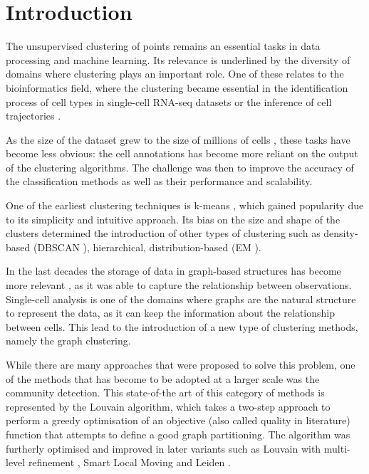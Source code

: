 \chapter*{Introduction} 

The unsupervised clustering of points remains an essential tasks in data processing and machine learning. Its relevance is underlined by the diversity of domains where clustering plays an important role. One of these relates to the bioinformatics field, where the clustering became essential in the identification process of cell types \cite{Kiselev2019a} in single-cell RNA-seq datasets or the inference of cell trajectories \cite{Saelens2019}.

As the size of the dataset grew to the size of millions of cells \cite{Svensson2020a}, these tasks have become less obvious: the cell annotations has become more reliant on the output of the clustering algorithms. The challenge was then to improve the accuracy of the classification methods as well as their performance and scalability.

One of the earliest clustering techniques is k-means \cite{Lloyd1982}, which gained popularity due to its simplicity and intuitive approach. Its bias on the size and shape of the clusters determined the introduction of other types of clustering such as density-based (DBSCAN \cite{ester1996}), hierarchical, distribution-based (EM \cite{Dempster1977}).

In the last decades the storage of data in graph-based structures has become more relevant \cite{cook2006mining}, as it was able to capture the relationship between observations. Single-cell analysis is one of the domains where graphs are the natural structure to represent the data, as it can keep the information about the relationship between cells. This lead to the introduction of a new type of clustering methods, namely the graph clustering.

While there are many approaches that were proposed to solve this problem, one of the methods that has become to be adopted at a larger scale was the community detection. This state-of-the art of this category of methods is represented by the Louvain \cite{Blondel2008b} algorithm, which takes a two-step approach to perform a greedy optimisation of an objective (also called quality in literature) function that attempts to define a good graph partitioning. The algorithm was furtherly optimised and improved in later variants such as Louvain with multi-level refinement \cite{Rotta2011}, Smart Local Moving \cite{Waltman2013} and Leiden \cite{Traag2019a}.

